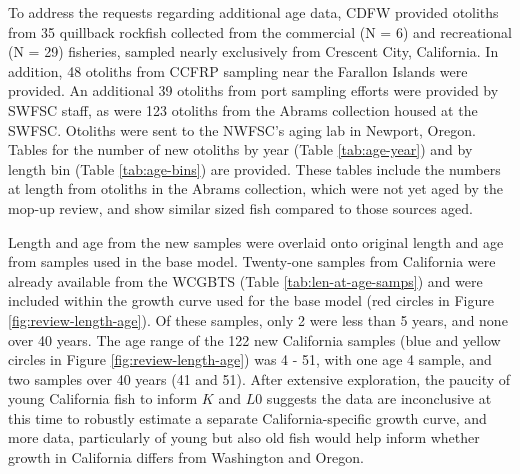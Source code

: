 \documentclass[11pt,
  english,
  letterpaper,
]{article}
\begin{document}
\leavevmode\tagmcend\tagstructend\par


To address the requests regarding additional age data, CDFW provided otoliths from 35 quillback rockfish collected from the commercial (N = 6) and recreational (N = 29) fisheries, sampled nearly exclusively from Crescent City, California. In addition, 48 otoliths from CCFRP sampling near the Farallon Islands were provided. An additional 39 otoliths from port sampling efforts were provided by SWFSC staff, as were 123 otoliths from the Abrams collection housed at the SWFSC. Otoliths were sent to the NWFSC's aging lab in Newport, Oregon. Tables for the number of new otoliths by year (Table \ref{tab:age-year}) and by length bin (Table \ref{tab:age-bins}) are provided. These tables include the numbers at length from otoliths in the Abrams collection, which were not yet aged by the mop-up review, and show similar sized fish compared to those sources aged.

\leavevmode\tagmcend\tagstructend\par


Length and age from the new samples were overlaid onto original length and age from samples used in the base model. Twenty-one samples from California were already available from the WCGBTS (Table \ref{tab:len-at-age-samps}) and were included within the growth curve used for the base model (red circles in Figure \ref{fig:review-length-age}). Of these samples, only 2 were less than 5 years, and none over 40 years. The age range of the 122 new California samples (blue and yellow circles in Figure \ref{fig:review-length-age}) was 4 - 51, with one age 4 sample, and two samples over 40 years (41 and 51). After extensive exploration, the paucity of young California fish to inform {\(K\)\leavevmode\tagmcend\tagstructend} and {\(L0\)\leavevmode\tagmcend\tagstructend} suggests the data are inconclusive at this time to robustly estimate a separate California-specific growth curve, and more data, particularly of young but also old fish would help inform whether growth in California differs from Washington and Oregon.

\leavevmode\tagmcend\tagstructend\par

\end{document}
